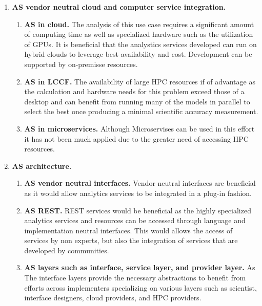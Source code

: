 \begin{enumerate}

\item{\bf AS vendor neutral cloud and computer service integration.}

  \begin{enumerate}
  
  \item {\bf AS in cloud.} The analysis of this use case requires a significant amount of computing time as well as specialized hardware such as the utilization of GPUs. It is beneficial that the analystics services developed can run on hybrid clouds to leverage best availability and cost. Development can be supported by on-premisse resources. 
  
  \item {\bf AS in LCCF.} The availability of large HPC resources if of advantage as the calculation and hardware needs for this problem exceed those of a desktop and can benefit from running many of the models in parallel to select the best once producing a minimal scientific accuracy measurement.
  
  \item {\bf AS in microservices.} Although Microservises can be used in this effort it has not been much applied due to the greater need of accessing HPC resources.
  
  \end{enumerate}

\item{\bf AS architecture.}

  \begin{enumerate}
  
  \item{\bf AS vendor neutral interfaces.} Vendor neutral interfaces are beneficial as it would allow analytics services to be integrated in a plug-in fashion.
  
  \item{\bf AS REST.} REST services would be beneficial as the highly specialized analytics services and resources can be accessed through language and implementation neutral interfaces. This would allows the access of services by non experts, but also the integration of services that are developed by communities.

  \item{\bf AS layers such as interface, service layer, and provider layer.} As The interface layers provide the necessary abstractions to benefit from efforts across implementers specializing on various layers such as scientist, interface designers, cloud providers, and HPC providers. 


\end{enumerate}
\end{enumerate}
